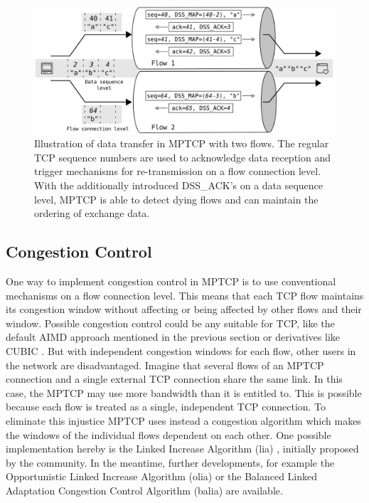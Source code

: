 \begin{figure}
	\begin{center}
		\def\svgwidth{1\textwidth}
		\includegraphics[scale=0.2]{../illustrations/importantConcepts/MPTCPDataTransfer.pdf}  
		\caption[Caption for the list of figures.]{Illustration of data transfer in MPTCP with two flows. The regular TCP sequence numbers are used to acknowledge data reception and trigger mechanisms for re-transmission on a flow connection level. With the additionally introduced DSS\_ACK's on a data sequence level, MPTCP is able to detect dying flows and can maintain the ordering of exchange data.}
		\label{fig:MPTCPDataTransfer}
	\end{center}
\end{figure}

\subsection*{Congestion Control}

One way to implement congestion control in MPTCP is to use conventional mechanisms on a flow connection level. This means that each TCP flow maintains its congestion window without affecting or being affected by other flows and their window. Possible congestion control could be any suitable for TCP, like the default AIMD approach \cite{rfc5681} mentioned in the previous section or derivatives like CUBIC \cite{rfc8312}. But with independent congestion windows for each flow, other users in the network are disadvantaged. Imagine that several flows of an MPTCP connection and a single external TCP connection share the same link. In this case, the MPTCP may use more bandwidth than it is entitled to.  This is possible because each flow is treated as a single, independent TCP connection. To eliminate this injustice MPTCP uses instead a congestion algorithm which makes the windows of the individual flows dependent on each other. One possible implementation hereby is the Linked Increase Algorithm (lia) \cite{rfc6356}, initially proposed by the community.  In the meantime, further developments, for example the Opportunistic Linked Increase Algorithm (olia) \cite{khalili-mptcp-congestion-control-05}  or the Balanced Linked Adaptation Congestion Control Algorithm (balia) \cite{walid-mptcp-congestion-control-04} are available.

